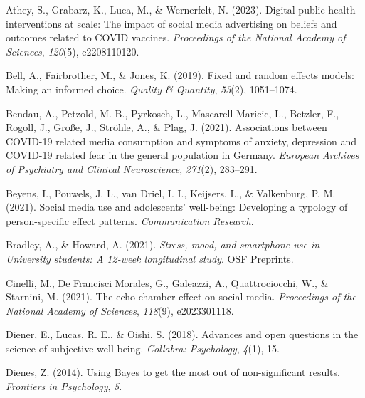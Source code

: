 \documentclass[
  man,mask,floatsintext]{apa7}
\newlength{\cslhangindent}
\newlength{\cslentryspacingunit} %
\newenvironment{CSLReferences}[2] %
 {%
  \setlength{\parindent}{0pt}
  \ifodd #1
  \let\oldpar\par
  \def\par{\hangindent=\cslhangindent\oldpar}
  \fi
  \setlength{\parskip}{#2\cslentryspacingunit}
 }%
 {}
\begin{document}
\hypertarget{refs}{}
\begin{CSLReferences}{1}{0}
\leavevmode{}%
Athey, S., Grabarz, K., Luca, M., \& Wernerfelt, N. (2023). Digital public health interventions at scale: {The} impact of social media advertising on beliefs and outcomes related to {COVID} vaccines. \emph{Proceedings of the National Academy of Sciences}, \emph{120}(5), e2208110120.

\leavevmode{}%
Bell, A., Fairbrother, M., \& Jones, K. (2019). Fixed and random effects models: Making an informed choice. \emph{Quality \& Quantity}, \emph{53}(2), 1051--1074.

\leavevmode{}%
Bendau, A., Petzold, M. B., Pyrkosch, L., Mascarell Maricic, L., Betzler, F., Rogoll, J., Große, J., Ströhle, A., \& Plag, J. (2021). Associations between {COVID-19} related media consumption and symptoms of anxiety, depression and {COVID-19} related fear in the general population in {Germany}. \emph{European Archives of Psychiatry and Clinical Neuroscience}, \emph{271}(2), 283--291.

\leavevmode{}%
Beyens, I., Pouwels, J. L., van Driel, I. I., Keijsers, L., \& Valkenburg, P. M. (2021). Social media use and adolescents' well-being: {Developing} a typology of person-specific effect patterns. \emph{Communication Research}.

\leavevmode{}%
Bradley, A., \& Howard, A. (2021). \emph{Stress, mood, and smartphone use in {University} students: {A} 12-week longitudinal study}. {OSF Preprints}.

\leavevmode{}%
Cinelli, M., De Francisci Morales, G., Galeazzi, A., Quattrociocchi, W., \& Starnini, M. (2021). The echo chamber effect on social media. \emph{Proceedings of the National Academy of Sciences}, \emph{118}(9), e2023301118.

\leavevmode{}%
Diener, E., Lucas, R. E., \& Oishi, S. (2018). Advances and open questions in the science of subjective well-being. \emph{Collabra: Psychology}, \emph{4}(1), 15.

\leavevmode{}%
Dienes, Z. (2014). Using {Bayes} to get the most out of non-significant results. \emph{Frontiers in Psychology}, \emph{5}.


\end{CSLReferences}
\end{document}
